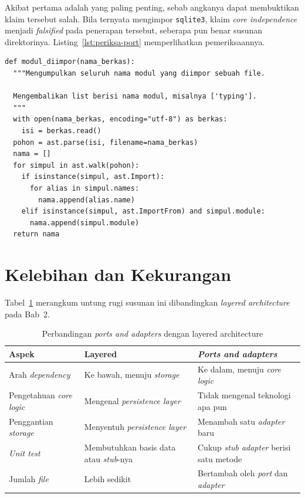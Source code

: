 Akibat pertama adalah yang paling penting, sebab angkanya dapat membuktikan
klaim tersebut salah. Bila  ternyata mengimpor
\texttt{sqlite3}, klaim \textit{core independence} menjadi \textit{falsified}
pada penerapan tersebut, seberapa pun benar susunan direktorinya.
Listing~\ref{lst:periksa-port} memperlihatkan pemeriksaannya.

\begin{lstlisting}[style=PythonStyle, caption={Pemeriksaan kemandirian logika
  inti, tersedia di \berkas{sources/chapter04/periksa_port.py}},
  label=lst:periksa-port]
def modul_diimpor(nama_berkas):
  """Mengumpulkan seluruh nama modul yang diimpor sebuah file.

  Mengembalikan list berisi nama modul, misalnya ['typing'].
  """
  with open(nama_berkas, encoding="utf-8") as berkas:
    isi = berkas.read()
  pohon = ast.parse(isi, filename=nama_berkas)
  nama = []
  for simpul in ast.walk(pohon):
    if isinstance(simpul, ast.Import):
      for alias in simpul.names:
        nama.append(alias.name)
    elif isinstance(simpul, ast.ImportFrom) and simpul.module:
      nama.append(simpul.module)
  return nama
\end{lstlisting}

\section{Kelebihan dan Kekurangan}

Tabel~\ref{tab:untung-rugi-port} merangkum untung rugi susunan ini dibandingkan
\textit{layered architecture} pada Bab~2.

\begin{table}[htbp]
  \centering
  \caption{Perbandingan \textit{ports and adapters} dengan layered
    architecture}
  \label{tab:untung-rugi-port}
  \begin{tabularx}{\textwidth}{|l|X|X|}
    \hline
    \textbf{Aspek} & \textbf{Layered} & \textbf{\textit{Ports and adapters}} \\
    \hline
    Arah \textit{dependency} & Ke bawah, menuju \textit{storage} & Ke dalam, menuju \textit{core logic} \\
    \hline
    Pengetahuan \textit{core logic} & Mengenal \textit{persistence layer} & Tidak mengenal teknologi apa pun \\
    \hline
    Penggantian \textit{storage} & Menyentuh \textit{persistence layer} & Menambah satu \textit{adapter} baru \\
    \hline
    \textit{Unit test} & Membutuhkan basis data atau \textit{stub}-nya & Cukup \textit{stub adapter} berisi satu metode \\
    \hline
    Jumlah \textit{file} & Lebih sedikit & Bertambah oleh \textit{port} dan \textit{adapter} \\
    \hline
  \end{tabularx}
\end{table}


